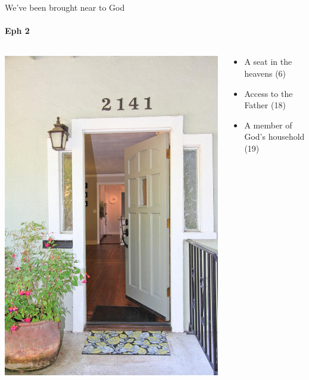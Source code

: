 \begin{frame}{We've been brought near to God}
\framesubtitle{Eph 2}

\begin{columns}[c]
\begin{column}{0.4\textwidth}
	\includegraphics[width=\columnwidth]{figures/openDoor.jpg}
\end{column}
\begin{column}{0.6\textwidth}
	\begin{itemize}
		\item A seat in the heavens (6)
		\item Access to the Father (18)
		\item A member of God's household (19)
	\end{itemize}
\end{column}
\end{columns}

\end{frame}


